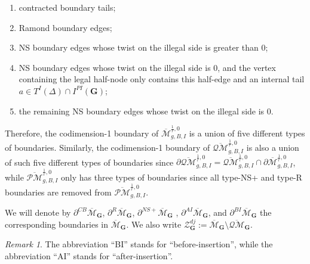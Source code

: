 \documentclass[11pt]{amsart}
\theoremstyle{definition}
\theoremstyle{remark}
\newtheorem{rmk}[dummy]{Remark}
\newcommand{\oPMb}{{\overline{\mathcal{PM}}}}
\newcommand{\oQMb}{{\overline{\mathcal{QM}}}}
\newcommand{\<}{\left<}
\renewcommand{\>}{\right>}
\numberwithin{equation}{section}
\def\Mbar{{\overline{\mathcal M}}}
\begin{document}
\begin{enumerate}
    \item[{CB}] contracted boundary %
tails;
    \item[{R}] Ramond boundary edges;
    \item[{NS+}] NS %
boundary edges whose twist on the illegal side is greater than $0$;
    \item[AI] NS boundary edges whose twist on the illegal side is $0$, and the vertex containing the legal half-node only contains this half-edge and an internal tail $a\in T^I(\Delta)\cap I^{PI}(\mathbf{G})$;
    \item[BI] the remaining NS boundary edges whose twist on the illegal side is $0$.
\end{enumerate}
Therefore, the codimension-1 boundary of $\Mbar^{\frac{1}{r},0}_{g,B,I}$ is a union of five different types of boundaries. Similarly, the codimension-1 boundary of $\oQMb^{\frac{1}{r},0}_{g,B,I}$ is also a union of such five different types of boundaries since $\partial \oQMb^{\frac{1}{r},0}_{g,B,I}=\oQMb^{\frac{1}{r},0}_{g,B,I}\cap  \partial \Mbar^{\frac{1}{r},0}_{g,B,I}$, while $\oPMb^{\frac{1}{r},0}_{g,B,I}$ only has three types of boundaries since all type-NS+ and type-R boundaries are removed from $\oPMb^{\frac{1}{r},0}_{g,B,I}$. 

We will denote by $\partial^{CB} \Mbar_{\bm{G}}$, $\partial^{R} \Mbar_{\bm{G}}$, $\partial^{NS+} \Mbar_{\bm{G}}$%
, $\partial^{AI} \Mbar_{\bm{G}}$, and %
$\partial^{BI} \Mbar_{\bm{G}}$ the corresponding boundaries in $\Mbar_{\bm{G}}$. We also write $\mathcal Z^{dj}_{\bm{G}}:=\Mbar_{\bm{G}}\setminus \oQMb_{\bm{G}}$.
\begin{rmk}
    The abbreviation ``BI'' stands %
for ``before-insertion'', while %
the abbreviation ``AI'' stands %
for ``after-insertion''. 
\end{rmk}
\end{document}
